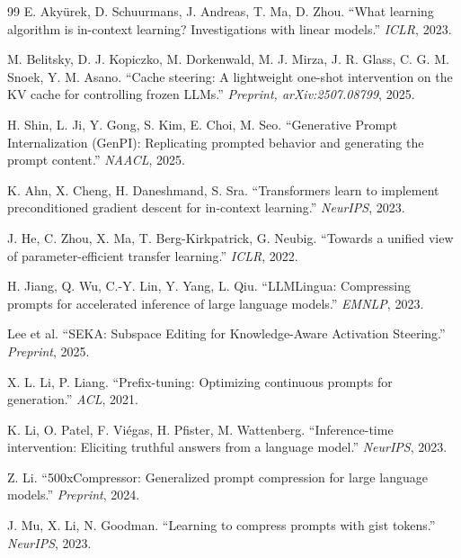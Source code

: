 \documentclass{article}
\theoremstyle{definition}
\begin{document}


\begin{thebibliography}{99}
E. Akyürek, D. Schuurmans, J. Andreas, T. Ma, D. Zhou.
``What learning algorithm is in-context learning? Investigations with linear models.''
\emph{ICLR}, 2023.

M. Belitsky, D. J. Kopiczko, M. Dorkenwald, M. J. Mirza, J. R. Glass, C. G. M. Snoek, Y. M. Asano.
``Cache steering: A lightweight one-shot intervention on the KV cache for controlling frozen LLMs.''
\emph{Preprint, arXiv:2507.08799}, 2025.

H. Shin, L. Ji, Y. Gong, S. Kim, E. Choi, M. Seo.
``Generative Prompt Internalization (GenPI): Replicating prompted behavior and generating the prompt content.''
\emph{NAACL}, 2025.

K. Ahn, X. Cheng, H. Daneshmand, S. Sra.
``Transformers learn to implement preconditioned gradient descent for in-context learning.''
\emph{NeurIPS}, 2023.

J. He, C. Zhou, X. Ma, T. Berg-Kirkpatrick, G. Neubig.
``Towards a unified view of parameter-efficient transfer learning.''
\emph{ICLR}, 2022.

H. Jiang, Q. Wu, C.-Y. Lin, Y. Yang, L. Qiu.
``LLMLingua: Compressing prompts for accelerated inference of large language models.''
\emph{EMNLP}, 2023.

Lee et al.
``SEKA: Subspace Editing for Knowledge-Aware Activation Steering.''
\emph{Preprint}, 2025.

X. L. Li, P. Liang.
``Prefix-tuning: Optimizing continuous prompts for generation.''
\emph{ACL}, 2021.

K. Li, O. Patel, F. Viégas, H. Pfister, M. Wattenberg.
``Inference-time intervention: Eliciting truthful answers from a language model.''
\emph{NeurIPS}, 2023.

Z. Li.
``500xCompressor: Generalized prompt compression for large language models.''
\emph{Preprint}, 2024.

J. Mu, X. Li, N. Goodman.
``Learning to compress prompts with gist tokens.''
\emph{NeurIPS}, 2023.


\end{thebibliography}
\end{document}
